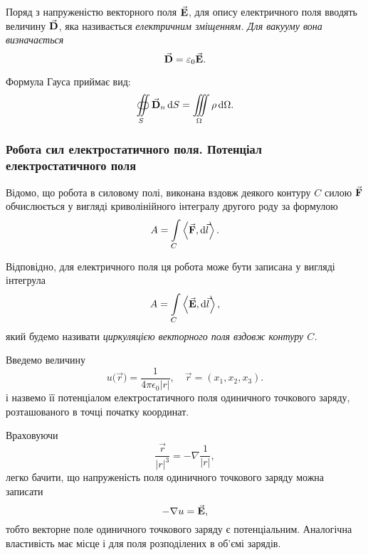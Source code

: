 \begin{definition}
	Поряд з напруженістю векторного поля ${\vec{\mathbf{E}}}$, для опису електричного поля вводять величину ${\vec{\mathbf{D}}}$, яка називається \it{електричним зміщенням}. Для вакууму вона визначається
	\begin{equation}
		{\vec{\mathbf{D}}} = \varepsilon_0 {\vec{\mathbf{E}}}.
	\end{equation}
\end{definition}

Формула Гауса приймає вид:
\begin{equation}
	\displaystyle\oiint\limits_S {\vec{\mathbf{D}}}_n \mathop{}\!\mathrm{d} S = \displaystyle\iiint\limits_\Omega \rho \mathop{}\!\mathrm{d} \Omega.
\end{equation}

\subsubsection{Робота сил електростатичного поля. Потенціал електростатичного поля}

Відомо, що робота в силовому полі, виконана вздовж деякого контуру $C$ силою ${\vec{\mathbf{F}}}$ обчислюється у вигляді криволінійного інтегралу другого роду за формулою
\begin{equation}
	A = \Int_C \langle \vecf F, \diff \vec l\rangle.
\end{equation}

\begin{definition}
	Відповідно, для електричного поля ця робота може бути записана у вигляді інтегрула
	\begin{equation}
		A = \Int_C \langle \vecf E, \diff \vec l\rangle,
	\end{equation} 
	який будемо називати \it{циркуляцією векторного поля} вздовж контуру $C$.
\end{definition}

\begin{definition}
	Введемо величину
	\begin{equation}
		u\Big(\vec r\Big) = \frac{1}{4 \pi \epsilon_0 |r|}, \quad \vec r = (x_1, x_2, x_3).
	\end{equation}
	і назвемо її потенціалом електростатичного поля одиничного точкового заряду, розташованого в точці початку координат.
\end{definition}

Враховуючи 
\begin{equation}
	\frac{\vec r}{|r|^3} = - \nabla \frac{1}{|r|},
\end{equation}
легко бачити, що напруженість поля одиничного точкового заряду можна записати 
\begin{equation}
	-\nabla u = {\vec{\mathbf{E}}},
\end{equation}
тобто векторне поле одиничного точкового заряду є потенціальним. Аналогічна властивість має місце і для поля розподілених в об'ємі зарядів. \medskip


